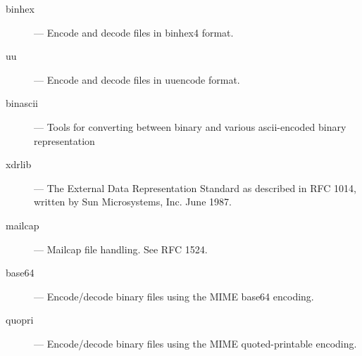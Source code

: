 \begin{description}
\item[binhex]
--- Encode and decode files in binhex4 format.

\item[uu]
--- Encode and decode files in uuencode format.

\item[binascii]
--- Tools for converting between binary and various ascii-encoded binary 
representation

\item[xdrlib]
--- The External Data Representation Standard as described in RFC 1014,
written by Sun Microsystems, Inc. June 1987.

\item[mailcap]
--- Mailcap file handling.  See RFC 1524.

\item[base64]
--- Encode/decode binary files using the MIME base64 encoding.

\item[quopri]
--- Encode/decode binary files using the MIME quoted-printable encoding.

\end{description}

